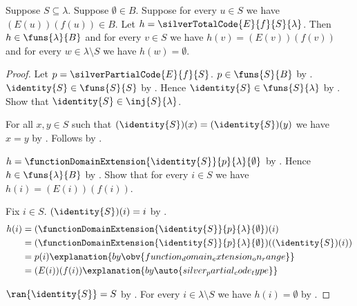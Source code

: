 \begin{proposition}\label{silver_total_code_type}
    Suppose $S\subseteq\lambda$.
    Suppose $\emptyset\in B$.
    Suppose for every $u\in S$ we have $(E(u))(f(u))\in B$.
    Let $h=\silverTotalCode{E}{f}{S}{\lambda}$.
    Then $h\in\funs{\lambda}{B}$ and
        for every $v\in S$ we have $h(v)=(E(v))(f(v))$ and
        for every $w\in\lambda\setminus S$ we have $h(w)=\emptyset$.
\end{proposition}
\begin{proof}
    Let $p=\silverPartialCode{E}{f}{S}$.
    $p\in\funs{S}{B}$ by .
    $\identity{S}\in\funs{S}{S}$ by .
    Hence $\identity{S}\in\funs{S}{\lambda}$
        by .
    Show that $\identity{S}\in\inj{S}{\lambda}$.
    \begin{subproof}
        For all $x,y\in S$ such that
            $(\identity{S})(x)=(\identity{S})(y)$ we have $x=y$
            by .
        Follows by .
    \end{subproof}
    $h=\functionDomainExtension{\identity{S}}{p}{\lambda}{\emptyset}$
        by .
    Hence $h\in\funs{\lambda}{B}$
        by .
    Show that for every $i\in S$ we have $h(i)=(E(i))(f(i))$.
    \begin{subproof}
        Fix $i\in S$.
        $(\identity{S})(i)=i$ by .
        \begin{align*}
            h(i)
                &= (\functionDomainExtension{\identity{S}}{p}
                    {\lambda}{\emptyset})(i)
                \\
                &= (\functionDomainExtension{\identity{S}}{p}
                    {\lambda}{\emptyset})((\identity{S})(i))
                \\
                &= p(i)
                    \explanation{by
                        \obv{function_domain_extension_on_range}}
                \\
                &= (E(i))(f(i))
                    \explanation{by \auto{silver_partial_code_type}}
        \end{align*}
    \end{subproof}
    $\ran{\identity{S}}=S$ by .
    For every $i\in\lambda\setminus S$ we have
        $h(i)=\emptyset$
        by .
\end{proof}

